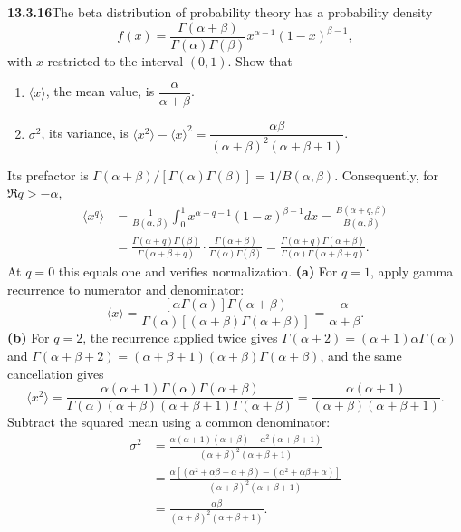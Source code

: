\par\bigskip
\noindent\textbf{13.3.16}\quad The beta distribution of probability theory has
a probability density
\[
f(x)=\frac{\Gamma(\alpha+\beta)}{\Gamma(\alpha)\Gamma(\beta)}
x^{\alpha-1}(1-x)^{\beta-1},
\]
with $x$ restricted to the interval $(0,1)$. Show that
\begin{enumerate}
\item[(a)] $\langle x\rangle$, the mean value, is
  $\dfrac{\alpha}{\alpha+\beta}$.
\item[(b)] $\sigma^{2}$, its variance, is
  $\langle x^{2}\rangle-\langle x\rangle^{2}
  =\dfrac{\alpha\beta}{(\alpha+\beta)^{2}(\alpha+\beta+1)}$.
\end{enumerate}
\par\smallskip
{}
\solution
{}
Its prefactor is
$\Gamma(\alpha+\beta)/[\Gamma(\alpha)\Gamma(\beta)]=1/B(\alpha,\beta)$.
Consequently, for $\Re q>-\alpha$,
\begin{align*}
\langle x^q\rangle
&=\frac1{B(\alpha,\beta)}\int_0^1x^{\alpha+q-1}(1-x)^{\beta-1}dx
=\frac{B(\alpha+q,\beta)}{B(\alpha,\beta)}\\
&=\frac{\Gamma(\alpha+q)\Gamma(\beta)}{\Gamma(\alpha+\beta+q)}
\cdot\frac{\Gamma(\alpha+\beta)}{\Gamma(\alpha)\Gamma(\beta)}
=\frac{\Gamma(\alpha+q)\Gamma(\alpha+\beta)}
{\Gamma(\alpha)\Gamma(\alpha+\beta+q)}.
\end{align*}
At $q=0$ this equals one and verifies normalization.
\textbf{(a)} For $q=1$, apply gamma recurrence to numerator and
denominator:
\[
\langle x\rangle
=\frac{[\alpha\Gamma(\alpha)]\Gamma(\alpha+\beta)}
{\Gamma(\alpha)[(\alpha+\beta)\Gamma(\alpha+\beta)]}
=\boxed{\frac\alpha{\alpha+\beta}}.
\]
\textbf{(b)} For $q=2$, the recurrence applied twice gives
$\Gamma(\alpha+2)=(\alpha+1)\alpha\Gamma(\alpha)$ and
$\Gamma(\alpha+\beta+2)=(\alpha+\beta+1)(\alpha+\beta)\Gamma(\alpha+\beta)$,
and the same cancellation gives
\[
\langle x^2\rangle
=\frac{\alpha(\alpha+1)\Gamma(\alpha)\Gamma(\alpha+\beta)}
{\Gamma(\alpha)(\alpha+\beta)(\alpha+\beta+1)\Gamma(\alpha+\beta)}
=\frac{\alpha(\alpha+1)}{(\alpha+\beta)(\alpha+\beta+1)}.
\]
Subtract the squared mean using a common denominator:
\begin{align*}
\sigma^2&=\frac{\alpha(\alpha+1)(\alpha+\beta)
-\alpha^2(\alpha+\beta+1)}{(\alpha+\beta)^2(\alpha+\beta+1)}\\
&=\frac{\alpha[(\alpha^2+\alpha\beta+\alpha+\beta)
-(\alpha^2+\alpha\beta+\alpha)]}
{(\alpha+\beta)^2(\alpha+\beta+1)}\\
&=\boxed{\frac{\alpha\beta}{(\alpha+\beta)^2(\alpha+\beta+1)}}.
\end{align*}


